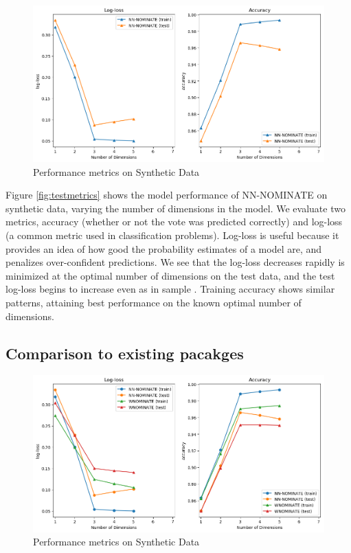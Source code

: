 \documentclass[11pt,]{article}
\begin{document}
\begin{figure}

{\centering \includegraphics[width=1\linewidth]{test_metrics} 

}

\caption{\label{fig:testmetrics}Performance metrics on Synthetic Data}\label{fig:unnamed-chunk-4}
\end{figure}

Figure \ref{fig:testmetrics} shows the model performance of NN-NOMINATE
on synthetic data, varying the number of dimensions in the model. We
evaluate two metrics, accuracy (whether or not the vote was predicted
correctly) and log-loss (a common metric used in classification
problems). Log-loss is useful because it provides an idea of how good
the probability estimates of a model are, and penalizes over-confident
predictions. We see that the log-loss decreases rapidly is minimized at
the optimal number of dimensions on the test data, and the test log-loss
begins to increase even as in sample . Training accuracy shows similar
patterns, attaining best performance on the known optimal number of
dimensions.

\subsection{Comparison to existing
pacakges}\label{comparison-to-existing-pacakges}

\begin{figure}

{\centering \includegraphics[width=1\linewidth]{test_metrics_with_wnom} 

}

\caption{\label{fig:testmetricswnom}Performance metrics on Synthetic Data}\label{fig:unnamed-chunk-5}
\end{figure}
\end{document}
